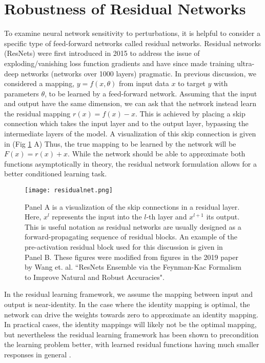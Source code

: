 \documentclass[12pt]{article}
\begin{document}
\section{Robustness of Residual Networks}
To examine neural network sensitivity to perturbations, it is helpful to consider a specific type of feed-forward networks called residual networks. Residual networks (ResNets) were first introduced in 2015 to address the issue of exploding/vanishing loss function gradients and have since made training ultra-deep networks (networks over 1000 layers) pragmatic. In previous discussion, we considered a mapping, $y = f(x,\theta)$ from input data $x$ to target $y$ with parameters $\theta$, to be learned by a feed-forward network. Assuming that the input and output have the same dimension, we can ask that the network instead learn the residual mapping $r(x) = f(x)-x$. This is achieved by placing a skip connection which takes the input layer and to the output layer, bypassing the intermediate layers of the model. A visualization of this skip connection is given in (Fig \ref{fig:resnet} A) Thus, the true mapping to be learned by the network will be $F(x) = r(x) + x$. While the network should be able to approximate both functions asymptotically in theory, the residual network formulation allows for a better conditioned learning task. \\
\begin{figure}
  \centering
  \texttt{[image: residualnet.png]}
  \caption{Panel A is a visualization of the skip connections in a residual layer. Here, $x^l$ represents the input into the $l$-th layer and $x^{l+1}$ its output. This is useful notation as residual networks are usually designed as a forward-propagating sequence of residual blocks. An example of the pre-activation residual block used for this discussion is given in Panel B. These figures were modified from figures in the 2019 paper by Wang et. al. ``ResNets Ensemble via the Feynman-Kac Formalism to Improve Natural and Robust Accuracies"\cite{res}.}
  \label{fig:resnet}
\end{figure}
\indent In the residual learning framework, we assume the mapping between input and output is near-identity. In the case where the identity mapping is optimal, the network can drive the weights towards zero to approximate an identity mapping. In practical cases, the identity mappings will likely not be the optimal mapping, but nevertheless the residual learning framework has been shown to precondition the learning problem better, with learned residual functions having much smaller responses in general \cite{res}.
\end{document}
